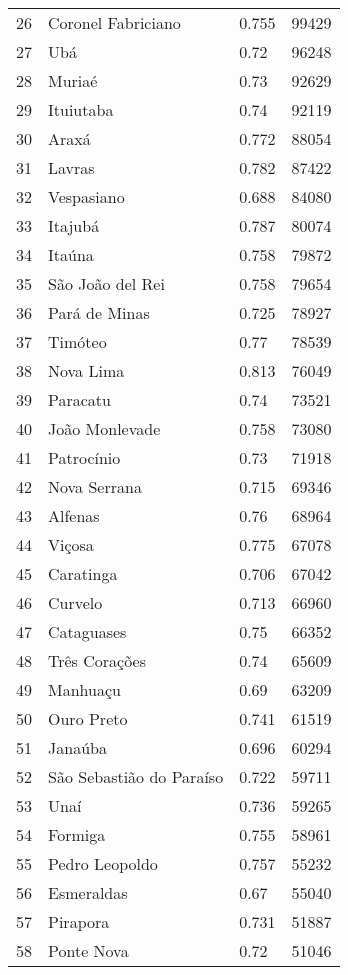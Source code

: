 \begin{table}[H]
\begin{tabular}{r|l|l|l}
		26	 &  Coronel Fabriciano  & 0.755	 &  99429 	\\
		27	 &  Ubá & 0.72 	 &  96248 \\
		28	 &  Muriaé  & 0.73 	 &  92629 	\\
		29	 &  Ituiutaba   & 0.74 	 &  92119 	\\
		30	 &  Araxá   & 0.772	 &  88054 	\\
		31	 &  Lavras  & 0.782	 &  87422 	\\
		32	 &  Vespasiano  & 0.688	 &  84080 	\\
		33	 &  Itajubá & 0.787	 &  80074 \\
		34	 &  Itaúna  & 0.758	 &  79872 	\\
		35	 &  São João del Rei    & 0.758	 &  79654 	\\
		36	 &  Pará de Minas   & 0.725	 &  78927 	\\
		37	 &  Timóteo & 0.77 	 &  78539 \\
		38	 &  Nova Lima   & 0.813	 &  76049 	\\
		39	 &  Paracatu    & 0.74 	 &  73521 	\\
		40	 &  João Monlevade  & 0.758	 &  73080 	\\
		41	 &  Patrocínio  & 0.73 	 &  71918 	\\
		42	 &  Nova Serrana    & 0.715	 &  69346 	\\
		43	 &  Alfenas & 0.76 	 &  68964 \\
		44	 &  Viçosa  & 0.775	 &  67078 	\\
		45	 &  Caratinga   & 0.706	 &  67042 	\\
		46	 &  Curvelo & 0.713	 &  66960 \\
		47	 &  Cataguases  & 0.75 	 &  66352 	\\
		48	 &  Três Corações   & 0.74 	 &  65609 	\\
		49	 &  Manhuaçu    & 0.69 	 &  63209 	\\
		50	 &  Ouro Preto  & 0.741	 &  61519 	\\
		51	 &  Janaúba & 0.696	 &  60294 \\
		52	 &  São Sebastião do Paraíso    & 0.722	 &  59711 	\\
		53	 &  Unaí    & 0.736	 &  59265 	\\
		54	 &  Formiga & 0.755	 &  58961 \\
		55	 &  Pedro Leopoldo  & 0.757	 &  55232 	\\
		56	 &  Esmeraldas  & 0.67 	 &  55040 	\\
		57	 &  Pirapora    & 0.731	 &  51887 	\\
		58	 &  Ponte Nova  & 0.72 	 &  51046 	\\

	\end{tabular}
\end{table}




